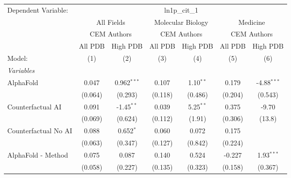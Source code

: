 \begingroup
\centering
\begin{tabular}{lcccccc}
   \tabularnewline \midrule \midrule
   Dependent Variable: & \multicolumn{6}{c}{ln1p\_cit\_1}\\
 & \multicolumn{2}{c}{All Fields} & \multicolumn{2}{c}{Molecular Biology} & \multicolumn{2}{c}{Medicine} \\
\cmidrule(lr){2-3} \cmidrule(lr){4-5} \cmidrule(lr){6-7}
 & \multicolumn{2}{c}{CEM Authors} & \multicolumn{2}{c}{CEM Authors} & \multicolumn{2}{c}{CEM Authors} \\
\cmidrule(lr){2-3} \cmidrule(lr){4-5} \cmidrule(lr){6-7}
 & \multicolumn{1}{c}{All PDB} & \multicolumn{1}{c}{High PDB} & \multicolumn{1}{c}{All PDB} & \multicolumn{1}{c}{High PDB} & \multicolumn{1}{c}{All PDB} & \multicolumn{1}{c}{High PDB} \\
\cmidrule(lr){2-2} \cmidrule(lr){3-3} \cmidrule(lr){4-4} \cmidrule(lr){5-5} \cmidrule(lr){6-6} \cmidrule(lr){7-7}
   Model:                                                     & (1)          & (2)           & (3)          & (4)          & (5)     & (6)\\  
   \midrule
   \emph{Variables}\\
   AlphaFold                                                  & 0.047        & 0.962$^{***}$ & 0.107        & 1.10$^{**}$  & 0.179   & -4.88$^{***}$\\   
                                                              & (0.064)      & (0.293)       & (0.118)      & (0.486)      & (0.204) & (0.543)\\   
   Counterfactual AI                                          & 0.091        & -1.45$^{**}$  & 0.039        & 5.25$^{**}$  & 0.375   & -9.70\\   
                                                              & (0.069)      & (0.624)       & (0.112)      & (1.91)       & (0.306) & (13.8)\\   
   Counterfactual No AI                                       & 0.088        & 0.652$^{*}$   & 0.060        & 0.072        & 0.175   &   \\   
                                                              & (0.063)      & (0.347)       & (0.127)      & (0.842)      & (0.224) &   \\   
   AlphaFold - Method                                         & 0.075        & 0.087         & 0.140        & 0.524        & -0.227  & 1.93$^{***}$\\   
                                                              & (0.058)      & (0.227)       & (0.135)      & (0.323)      & (0.158) & (0.367)\\   

\end{tabular}
